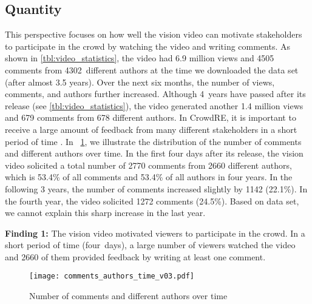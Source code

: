 \documentclass[conference]{IEEEtran}
\makeatletter
\newcommand{\textlabel}[2]{%
	\protected@edef\@currentlabel{#1}%
	\phantomsection%
	\label{#2}%
}
\makeatother
\begin{document}
{\subsection{Quantity}
\label{sec:quantity}
This perspective focuses on how well the vision video can motivate stakeholders to participate in the crowd by watching the video and writing comments. As shown in \tablename{ \ref{tbl:video_statistics}}, the video had 6.9 million views and 4505 comments from 4302~different authors at the time we downloaded the data set (after almost 3.5 years). Over the next six months, the number of views, comments, and authors further increased. Although 4~years have passed after its release (see \tablename{ \ref{tbl:video_statistics}}), the video generated another 1.4 million views and 679 comments from 678 different authors. In CrowdRE, it is important to receive a large amount of feedback from many different stakeholders in a short period of time \cite{Groen.2016}. In \figurename{~\ref{fig:comments_authors}}, we illustrate the distribution of the number of comments and different authors over time. In the first four days after its release, the vision video solicited a total number of 2770 comments from 2660 different authors, which is 53.4\% of all comments and 53.4\% of all authors in four years. In the following 3 years, the number of comments increased slightly by 1142 (22.1\%). In the fourth year, the video solicited 1272 comments (24.5\%). Based on data set, we cannot explain this sharp increase in the last year. %

\begin{mdframed}
	\textlabel{\protect Finding 1}{f1}\textbf{Finding 1:}
	The vision video motivated viewers to participate in the crowd. In a short period of time (four~days), a large number of viewers watched the video and 2660 of them provided feedback by writing at least one comment.
\end{mdframed}

\begin{figure}[htbp]
	\captionsetup{justification=justified}
	\centering
	\texttt{[image: comments\_authors\_time\_v03.pdf]}
	\caption{Number of comments and different authors over time}
	\label{fig:comments_authors}
\end{figure}

}
\end{document}
